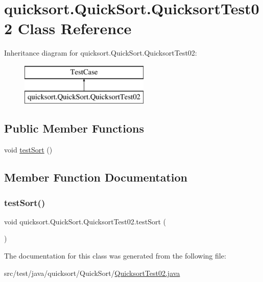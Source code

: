 \hypertarget{classquicksort_1_1_quick_sort_1_1_quicksort_test02}{}\section{quicksort.\+Quick\+Sort.\+Quicksort\+Test02 Class Reference}
\label{classquicksort_1_1_quick_sort_1_1_quicksort_test02}
Inheritance diagram for quicksort.\+Quick\+Sort.\+Quicksort\+Test02\+:\begin{figure}[H]
\begin{center}
\leavevmode
\includegraphics[height=2.000000cm]{classquicksort_1_1_quick_sort_1_1_quicksort_test02}
\end{center}
\end{figure}
\subsection*{Public Member Functions}
\begin{DoxyCompactItemize}
\item 
void \hyperlink{classquicksort_1_1_quick_sort_1_1_quicksort_test02_ac0ddefa96bd29b9be26b0ff9418f154c}{test\+Sort} ()
\end{DoxyCompactItemize}


\subsection{Member Function Documentation}
\hypertarget{classquicksort_1_1_quick_sort_1_1_quicksort_test02_ac0ddefa96bd29b9be26b0ff9418f154c}{}\label{classquicksort_1_1_quick_sort_1_1_quicksort_test02_ac0ddefa96bd29b9be26b0ff9418f154c} 
\subsubsection{\texorpdfstring{test\+Sort()}{testSort()}}
{\footnotesize\ttfamily void quicksort.\+Quick\+Sort.\+Quicksort\+Test02.\+test\+Sort (\begin{DoxyParamCaption}{ }\end{DoxyParamCaption})}



The documentation for this class was generated from the following file\+:\begin{DoxyCompactItemize}
\item 
src/test/java/quicksort/\+Quick\+Sort/\hyperlink{_quicksort_test02_8java}{Quicksort\+Test02.\+java}\end{DoxyCompactItemize}
